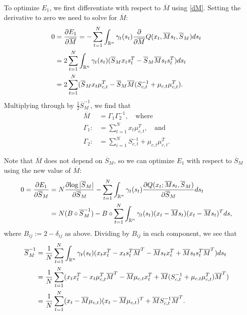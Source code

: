 \documentclass[12pt,leqno]{article}
\begin{document}
To optimize $E_1$, we first differentiate with respect to $\overline{M}$ using \eqref{dM}.
Setting the derivative to zero we need to solve for $\overline{M}$:
\begin{align*}
  0 &= \frac{\partial{E_1}}{\partial\overline{M}}
  = -\sum_{t=1}^N\int_{{\mathbb R}^n}\gamma_t(s_t)\frac{\partial}{\partial\overline{M}}Q(x_t,\overline{M}s_t,\overline{S}_M)ds_t\\
  &= 2\sum_{t=1}^N\int_{{\mathbb R}^n}\gamma_t(s_t)(\overline{S}_Mx_ts_t^T - \overline{S}_M\overline{M}s_ts_t^T)ds_t\\
  &= 2\sum_{t=1}^N(\overline{S}_Mx_t\mu_{c,t}^T - \overline{S}_M\overline{M}(S_{c,t}^{-1} + \mu_{c,t}\mu_{c,t}^T).
\end{align*}
Multiplying through by $\frac{1}{2}\overline{S}_M^{-1}$, we find that
\begin{equation}\label{M_bar}
  \begin{split}
    \overline{M} &= \Gamma_1\Gamma_2^{-1}, \quad\text{where}\\
    \Gamma_1 :&= \sum_{t=1}^Nx_t\mu_{c,t}^T, \quad\text{and}\\
    \Gamma_2 :&= \sum_{i=1}^NS_{c,t}^{-1} + \mu_{c,t}\mu_{c,t}^T.
  \end{split}
\end{equation}

Note that $\overline{M}$ does not depend on $\overline{S}_M$, so we can optimize $E_1$ with respect to $\overline{S}_M$
using the new value of $\overline{M}$:
\begin{align*}
  0 = \frac{\partial{E_1}}{\partial{\overline{S}_M}} &=
   N\frac{\partial{\log|\overline{S}_M|}}{\partial\overline{S}_M}
  - \sum_{t=1}^N\int_{{\mathbb R}^n}\gamma_t(s_t)\frac{\partial{Q(x_t;\overline{M}s_t,\overline{S}_M)}}{\partial{\overline{S}_M}}ds_t \\
  &= N(B\circ\overline{S}_M^{-1}) - B\circ\sum_{t=1}^N
  \int_{{\mathbb R}^n}\gamma_t(s_t)(x_t-\overline{M}s_t)(x_t-\overline{M}s_t)^Tds,
\end{align*}
where $B_{ij} := 2-\delta_{ij}$ as above.  Dividing by $B_{ij}$ in each component, we see that
\begin{equation}\label{S_M}
  \begin{split}
    \overline{S}_M^{-1} &= \frac{1}{N}\sum_{t=1}^N\int_{{\mathbb R}^n}\gamma_t(s_t)(x_tx_t^T - x_ts_t^T\overline{M}^T
    - \overline{M}s_tx_t^T + \overline{M}s_ts_t^T\overline{M}^T)ds_t \\
    &= \frac{1}{N}\sum_{t=1}^N(x_tx_t^T - x_t\mu_{c,t}^T\overline{M}^T - \overline{M}\mu_{c,t}x_t^T +
    \overline{M}(S_{c,t}^{-1}+\mu_{c,t}\mu_{c,t}^T)\overline{M}^T)\\
    &= \frac{1}{N}\sum_{t=1}^N(x_t-\overline{M}\mu_{c,t})(x_t-\overline{M}\mu_{c,t})^T +
    \overline{M}S_{c,t}^{-1}\overline{M}^T.
  \end{split}
\end{equation}
\end{document}
